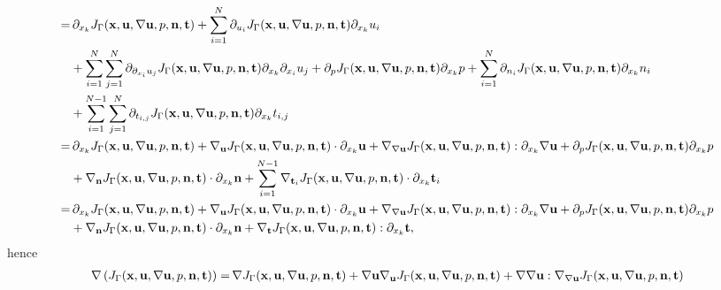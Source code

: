 \documentclass[oneside]{book}
\numberwithin{equation}{section}
\begin{document}
\begin{enumerate}[leftmargin=0in]
\begin{align*}
        =&\, \partial_{x_k}J_\Gamma({\bf x},{\bf u},\nabla{\bf u},p,{\bf n},{\bf t}) + \sum_{i=1}^N \partial_{u_i}J_\Gamma({\bf x},{\bf u},\nabla{\bf u},p,{\bf n},{\bf t})\partial_{x_k}u_i\\
        &+ \sum_{i=1}^N\sum_{j=1}^N \partial_{\partial_{x_i}u_j}J_\Gamma({\bf x},{\bf u},\nabla{\bf u},p,{\bf n},{\bf t})\partial_{x_k}\partial_{x_i}u_j + \partial_pJ_\Gamma({\bf x},{\bf u},\nabla{\bf u},p,{\bf n},{\bf t})\partial_{x_k}p + \sum_{i=1}^N \partial_{n_i}J_\Gamma({\bf x},{\bf u},\nabla{\bf u},p,{\bf n},{\bf t})\partial_{x_k}n_i\\
        &+ \sum_{i=1}^{N-1}\sum_{j=1}^N \partial_{t_{i,j}}J_\Gamma({\bf x},{\bf u},\nabla{\bf u},p,{\bf n},{\bf t})\partial_{x_k}t_{i,j}\\
        =&\, \partial_{x_k}J_\Gamma({\bf x},{\bf u},\nabla{\bf u},p,{\bf n},{\bf t}) + \nabla_{\bf u}J_\Gamma({\bf x},{\bf u},\nabla{\bf u},p,{\bf n},{\bf t})\cdot\partial_{x_k}{\bf u} + \nabla_{\nabla{\bf u}}J_\Gamma({\bf x},{\bf u},\nabla{\bf u},p,{\bf n},{\bf t}):\partial_{x_k}\nabla{\bf u} + \partial_pJ_\Gamma({\bf x},{\bf u},\nabla{\bf u},p,{\bf n},{\bf t})\partial_{x_k}p\\
        &+ \nabla_{\bf n}J_\Gamma({\bf x},{\bf u},\nabla{\bf u},p,{\bf n},{\bf t})\cdot\partial_{x_k}{\bf n} + \sum_{i=1}^{N-1} \nabla_{{\bf t}_i}J_\Gamma({\bf x},{\bf u},\nabla{\bf u},p,{\bf n},{\bf t})\cdot\partial_{x_k}{\bf t}_i\\
        =&\, \partial_{x_k}J_\Gamma({\bf x},{\bf u},\nabla{\bf u},p,{\bf n},{\bf t}) + \nabla_{\bf u}J_\Gamma({\bf x},{\bf u},\nabla{\bf u},p,{\bf n},{\bf t})\cdot\partial_{x_k}{\bf u} + \nabla_{\nabla{\bf u}}J_\Gamma({\bf x},{\bf u},\nabla{\bf u},p,{\bf n},{\bf t}):\partial_{x_k}\nabla{\bf u} + \partial_pJ_\Gamma({\bf x},{\bf u},\nabla{\bf u},p,{\bf n},{\bf t})\partial_{x_k}p\\
        &+ \nabla_{\bf n}J_\Gamma({\bf x},{\bf u},\nabla{\bf u},p,{\bf n},{\bf t})\cdot\partial_{x_k}{\bf n} + \nabla_{\bf t}J_\Gamma({\bf x},{\bf u},\nabla{\bf u},p,{\bf n},{\bf t}):\partial_{x_k}{\bf t},
    \end{align*}
    hence
    \begin{align*}
        \nabla\left(J_\Gamma({\bf x},{\bf u},\nabla{\bf u},p,{\bf n},{\bf t})\right) =&\, \nabla J_\Gamma({\bf x},{\bf u},\nabla{\bf u},p,{\bf n},{\bf t}) + \nabla{\bf u}\nabla_{\bf u}J_\Gamma({\bf x},{\bf u},\nabla{\bf u},p,{\bf n},{\bf t}) + \nabla\nabla{\bf u}:\nabla_{\nabla{\bf u}}J_\Gamma({\bf x},{\bf u},\nabla{\bf u},p,{\bf n},{\bf t})\\

\end{align*}
\end{enumerate}
\end{document}
